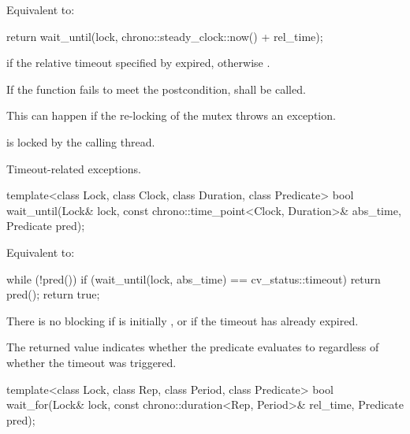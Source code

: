 \begin{itemdescr}
\pnum
\effects Equivalent to:
\begin{codeblock}
return wait_until(lock, chrono::steady_clock::now() + rel_time);
\end{codeblock}

\pnum
\returns {} if
the relative timeout specified by  expired,
otherwise .

\pnum
\remarks
If the function fails to meet the postcondition, 
shall be called.
\begin{note} This can happen if the re-locking of the mutex throws an exception. \end{note}

\pnum
\postconditions {} is locked by the calling thread.

\pnum
\throws Timeout-related
exceptions.

\end{itemdescr}

%
\begin{itemdecl}
template<class Lock, class Clock, class Duration, class Predicate>
  bool wait_until(Lock& lock, const chrono::time_point<Clock, Duration>& abs_time, Predicate pred);
\end{itemdecl}

\begin{itemdescr}
\pnum
\effects Equivalent to:
\begin{codeblock}
while (!pred())
  if (wait_until(lock, abs_time) == cv_status::timeout)
    return pred();
return true;
\end{codeblock}

\pnum
\begin{note} There is no blocking if  is initially , or
if the timeout has already expired. \end{note}

\pnum
\begin{note} The returned value indicates whether the predicate evaluates to 
regardless of whether the timeout was triggered. \end{note}
\end{itemdescr}

%
\begin{itemdecl}
template<class Lock, class Rep, class Period, class Predicate>
  bool wait_for(Lock& lock, const chrono::duration<Rep, Period>& rel_time, Predicate pred);
\end{itemdecl}

